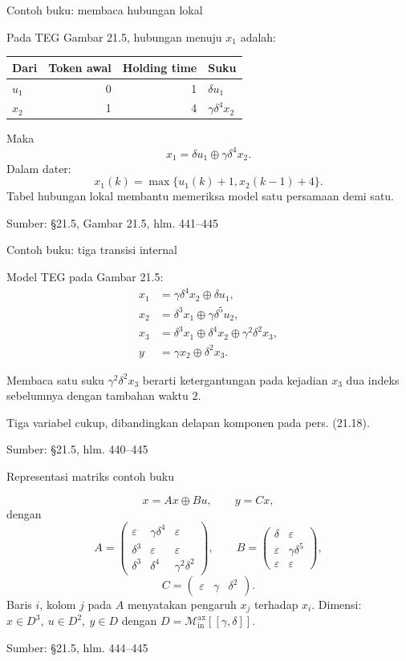 \documentclass[aspectratio=169,11pt]{beamer}
\newcommand{\source}[1]{%
    \vfill
    \hfill{\tiny\color{gray}Sumber: #1}
}
\newcommand{\eps}{\varepsilon}
\newcommand{\D}{\mathcal{M}_{\mathrm{in}}^{\mathrm{ax}}[[\gamma,\delta]]}
\newcommand{\mpmat}[1]{\begin{pmatrix}#1\end{pmatrix}}
\begin{document}
\begin{frame}{Contoh buku: membaca hubungan lokal}

Pada TEG Gambar 21.5, hubungan menuju $x_1$ adalah:
\begin{center}\begin{tabular}{lrrl}\toprule
Dari&Token awal&Holding time&Suku\\\midrule
$u_1$&0&1&$\delta u_1$\\
$x_2$&1&4&$\gamma\delta^4x_2$\\\bottomrule
\end{tabular}\end{center}
Maka
\[
x_1=\delta u_1\oplus\gamma\delta^4x_2.
\]
Dalam dater:
\[
x_1(k)=\max\{u_1(k)+1,x_2(k-1)+4\}.
\]
Tabel hubungan lokal membantu memeriksa model satu persamaan demi satu.

\source{\S21.5, Gambar 21.5, hlm. 441--445}
\end{frame}
\begin{frame}{Contoh buku: tiga transisi internal}

\small

Model TEG pada Gambar 21.5:
\begin{align*}
x_1&=\gamma\delta^4x_2\oplus\delta u_1,\\
x_2&=\delta^3x_1\oplus\gamma\delta^5u_2,\\
x_3&=\delta^3x_1\oplus\delta^4x_2\oplus\gamma^2\delta^2x_3,\\
y&=\gamma x_2\oplus\delta^2x_3.
\end{align*}
\begin{exampleblock}{Membaca satu suku}
$\gamma^2\delta^2x_3$ berarti ketergantungan pada kejadian $x_3$
dua indeks sebelumnya dengan tambahan waktu $2$.
\end{exampleblock}
Tiga variabel cukup, dibandingkan delapan komponen pada pers. (21.18).

\source{\S21.5, hlm. 440--445}

\end{frame}
\begin{frame}{Representasi matriks contoh buku}


\[
x=Ax\oplus Bu,\qquad y=Cx,
\]
dengan
\[
A=\mpmat{\eps&\gamma\delta^4&\eps\\
\delta^3&\eps&\eps\\
\delta^3&\delta^4&\gamma^2\delta^2},
\qquad
B=\mpmat{\delta&\eps\\\eps&\gamma\delta^5\\\eps&\eps},
\]
\[
C=\mpmat{\eps&\gamma&\delta^2}.
\]
Baris $i$, kolom $j$ pada $A$ menyatakan pengaruh $x_j$ terhadap $x_i$.
Dimensi: $x\in D^3,\ u\in D^2,\ y\in D$ dengan $D=\D$.

\source{\S21.5, hlm. 444--445}

\end{frame}
\end{document}
